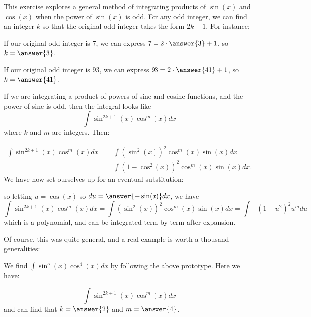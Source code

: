 \documentclass{ximera}
\author{Jim Talamo and Bart Snapp}
\begin{document}
\begin{exercise}

This exercise explores a general method of integrating products of $\sin(x)$ and $\cos(x)$ when the power of $\sin(x)$ is odd.  For any odd integer, we can find an integer $k$ so that the original odd integer takes the form $2k+1$.  For instance:

\begin{exercise}
If our original odd integer is $7$, we can express $7 = 2 \cdot \answer{3}+1$, so $k=\answer{3}$.

If our original odd integer is $93$, we can express $93 = 2 \cdot \answer{41}+1$, so $k=\answer{41}$.
\end{exercise}

 If we are integrating a product of powers of sine and cosine functions, and the power of sine is odd, then the integral looks like
\[
\int \sin^{2k+1}(x) \cos^m(x) dx
\]
where $k$ and $m$ are integers.  Then:

\begin{align*}
  \int \sin^{2k+1}(x) \cos^m(x) dx &=\int(\sin^{2}(x))^2 \cos^m(x) \sin(x) dx\\
  &= \int (1-\cos^2(x))^2 \cos^m(x) \sin(x)dx.
\end{align*}
We have now set ourselves up for an eventual substitution:
\begin{center}%
\end{center}
so letting $u = \cos(x)$ so $du =\answer{-\sin(x)} dx$, we have
\[
  \int \sin^{2k+1}(x) \cos^m(x) dx =\int(\sin^{2}(x))^2 \cos^m(x) \sin(x) dx = \int -(1-u^2)^2 u^m du
\]
which is a polynomial, and can be integrated term-by-term after expansion.

Of course, this was quite general, and a real example is worth a thousand generalities:

\begin{exercise}
We find $\int \sin^5(x) \cos^4(x) dx$ by following the above prototype.  Here we have:

\[
\int \sin^{2k+1}(x) \cos^m(x) dx
\]
and can find that $k=\answer{2}$ and $m=\answer{4}$.


\end{exercise}
\end{exercise}
\end{document}
